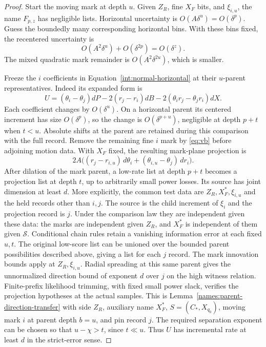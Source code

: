\begin{proof}
Start the moving mark at depth $u$. Given
$Z_R$, fine $X_F$ bits, and $\xi_{i,u}$,
the name $F_{p,z}$ has negligible lists.
Horizontal uncertainty is
$O(A\delta^u)=O(\delta^p)$. Guess the
boundedly many corresponding horizontal
bins. With these bins fixed, the recentered
uncertainty is
\[
 O(A^2\delta^u)+O(\delta^{2p})
        =O(\delta^z).
\]
The mixed quadratic mark remainder is
$O(A^2\delta^{2u})$, which is smaller.

Freeze the $i$ coefficients in
Equation~\eqref{int:normal-horizontal}
at their $u$-parent representatives.
Indeed its expanded form is
\[
 U=(\theta_i-\theta_j)dP-2(r_j-r_i)dB
                  -2(\theta_ir_j-\theta_jr_i)dX.
\]
Each coefficient changes by $O(\delta^u)$.
On a horizontal parent its centered increment
has size $O(\delta^p)$, so the change is
$O(\delta^{p+u})$, negligible at depth $p+t$
when $t<u$. Absolute shifts at the parent
are retained during this comparison with the
full record. Remove the
remaining fine $i$ mark by
\eqref{eq:vb} before adjoining motion
data. With $X_F$ fixed, the resulting
mark-plane projection is
\[
 2A\bigl((r_j-r_{i,u})\,d\theta_i
          +(\theta_{i,u}-\theta_j)\,dr_i\bigr).
\]
After dilation of the mark parent,
a low-rate list at depth $p+t$ becomes
a projection list at depth $t$, up to
arbitrarily small power losses. Its
source has joint dimension at least $d$.
More explicitly, the common test data are
$Z_R,X_F^*,\xi_{i,u}$ and the held records
other than $i,j$. The source is the child
increment of $\xi_i$ and the projection
record is $j$. Under the comparison law
they are independent given these data:
the marks are independent given $Z_R$,
and $X_F^*$ is independent of them given
$\mathcal S$. Conditional chain rules
retain a vanishing information error at
each fixed $u,t$. The original low-score
list can be unioned over the bounded
parent possibilities described above,
giving a list for each $j$ record.
The mark innovation bounds apply at
$Z_R,\xi_{i,u}$. Radial spreading at
this same parent gives the unnormalized
direction bound of exponent $d$ over
$j$ on the high witness relation.
Finite-prefix likelihood trimming,
with fixed small power slack, verifies
the projection hypotheses at the
actual samples.
This is Lemma~\ref{names:parent-direction-transfer}
with side $Z_R$, auxiliary name $X_F^*$,
$S=(C_*,X_{q_0})$, moving mark $i$ at
parent depth $b=u$, and pin record $j$.
The required separation exponent can be chosen
so that $u-\chi>t$, since $t\ll u$.
Thus $U$ has incremental rate at least
$d$ in the strict-error sense.


\end{proof}
